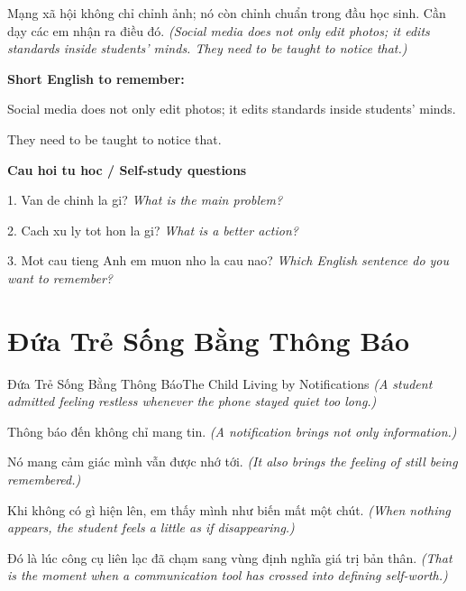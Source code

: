 \begin{baihoc}
Mạng xã hội không chỉ chỉnh ảnh; nó còn chỉnh chuẩn trong đầu học sinh. Cần dạy các em nhận ra điều đó.
\textit{(Social media does not only edit photos; it edits standards inside students’ minds. They need to be taught to notice that.)}
\end{baihoc}

\begin{ghinhoanh}
\textbf{Short English to remember:}

Social media does not only edit photos; it edits standards inside students’ minds.

They need to be taught to notice that.

\end{ghinhoanh}

\begin{tuhocnhanh}
\textbf{Cau hoi tu hoc / Self-study questions}

1. Van de chinh la gi? \textit{What is the main problem?}

2. Cach xu ly tot hon la gi? \textit{What is a better action?}

3. Mot cau tieng Anh em muon nho la cau nao? \textit{Which English sentence do you want to remember?}
\end{tuhocnhanh}
\ngancach

\section{Đứa Trẻ Sống Bằng Thông Báo}
\begin{truyen}{Đứa Trẻ Sống Bằng Thông Báo}{The Child Living by Notifications}
\textit{(A student admitted feeling restless whenever the phone stayed quiet too long.)}

Thông báo đến không chỉ mang tin.
\textit{(A notification brings not only information.)}

Nó mang cảm giác mình vẫn được nhớ tới.
\textit{(It also brings the feeling of still being remembered.)}

Khi không có gì hiện lên, em thấy mình như biến mất một chút.
\textit{(When nothing appears, the student feels a little as if disappearing.)}

Đó là lúc công cụ liên lạc đã chạm sang vùng định nghĩa giá trị bản thân.
\textit{(That is the moment when a communication tool has crossed into defining self-worth.)}

\end{truyen}

